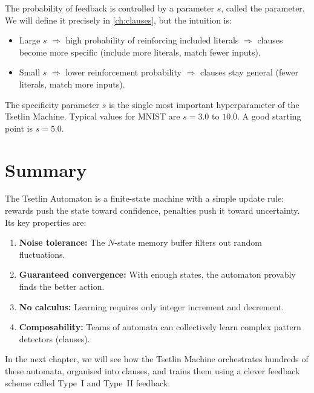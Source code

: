 The probability of feedback is controlled by a parameter $s$, called
the  parameter. We will define it precisely in
\cref{ch:clauses}, but the intuition is:

\begin{itemize}
  \item Large $s$ $\Rightarrow$ high probability of reinforcing
    included literals $\Rightarrow$ clauses become more specific
    (include more literals, match fewer inputs).
  \item Small $s$ $\Rightarrow$ lower reinforcement probability
    $\Rightarrow$ clauses stay general (fewer literals, match more
    inputs).
\end{itemize}

\begin{engineernote}
The specificity parameter $s$ is the single most important
hyperparameter of the Tsetlin Machine. Typical values for MNIST are
$s = 3.0$ to $10.0$. A good starting point is $s = 5.0$.
\end{engineernote}


\section{Summary}
\label{sec:ch5-summary}

The Tsetlin Automaton is a finite-state machine with a simple update
rule: rewards push the state toward confidence, penalties push it
toward uncertainty. Its key properties are:

\begin{enumerate}
  \item \textbf{Noise tolerance:} The $N$-state memory buffer filters
    out random fluctuations.
  \item \textbf{Guaranteed convergence:} With enough states, the
    automaton provably finds the better action.
  \item \textbf{No calculus:} Learning requires only integer
    increment and decrement.
  \item \textbf{Composability:} Teams of automata can collectively
    learn complex pattern detectors (clauses).
\end{enumerate}

In the next chapter, we will see how the Tsetlin Machine orchestrates
hundreds of these automata, organised into clauses, and trains them
using a clever feedback scheme called Type~I and Type~II feedback.
